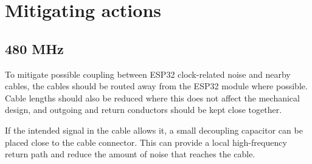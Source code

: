 \section{Mitigating actions}

\subsection{480 MHz}
To mitigate possible coupling between ESP32 clock-related noise and nearby cables, the
cables should be routed away from the ESP32 module where possible. Cable lengths should
also be reduced where this does not affect the mechanical design, and outgoing and return
conductors should be kept close together.

If the intended signal in the cable allows it, a small decoupling capacitor can be placed
close to the cable connector. This can provide a local high-frequency return path and
reduce the amount of noise that reaches the cable.


